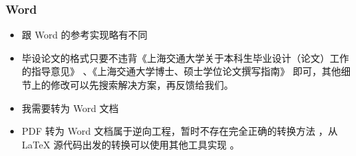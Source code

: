 \begin{frame}

  \frametitle{Word}

  \begin{itemize}

    \item[{\faQuestionCircle[regular]}] 跟 Word 的参考实现略有不同

    \item[{\faCheckCircle[regular]}] 毕设论文的格式只要不违背《上海交通大学关于本科生毕业设计（论文）工作的指导意见》 、《上海交通大学博士、硕士学位论文撰写指南》  即可，其他细节上的修改可以先搜索解决方案，再反馈给我们。

    \item[{\faQuestionCircle[regular]}] 我需要转为 Word 文档

    \item[{\faCheckCircle[regular]}] PDF 转为 Word 文档属于逆向工程，暂时不存在完全正确的转换方法 ，从 \LaTeX{} 源代码出发的转换可以使用其他工具实现  。

  \end{itemize}

\end{frame}

